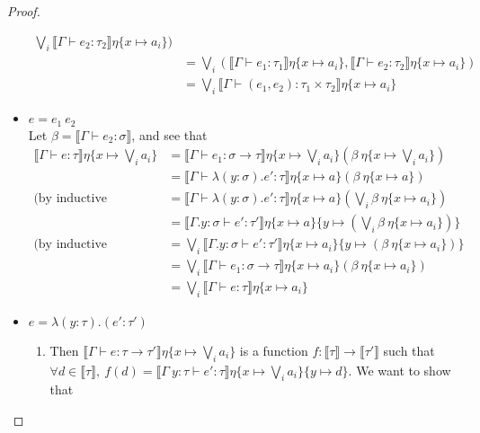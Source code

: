 \begin{proof}
\begin{itemize}
\begin{align*}
 \bigvee_i \llbracket \Gamma \vdash e_2 : \tau_2 \rrbracket\eta\{x \mapsto a_i\}) \\
 &= \bigvee_i ( \llbracket \Gamma \vdash e_1 : \tau_1 \rrbracket\eta\{x \mapsto a_i\},
  \llbracket \Gamma \vdash e_2 : \tau_2 \rrbracket\eta\{x \mapsto a_i\}) \\
  &= \bigvee_i \llbracket \Gamma \vdash (e_1, e_2): \tau_1 \times \tau_2 \rrbracket\eta\{x\mapsto a_i\}
  \end{align*}
 \item $ e = e_1 \ e_2$ \\ 
Let $\beta = \llbracket \Gamma \vdash e_2 : \sigma \rrbracket$, and see that
\begin{align*}
\llbracket \Gamma \vdash e : \tau \rrbracket\eta\{x \mapsto \bigvee_i a_i \} &=
\llbracket \Gamma \vdash e_1 : \sigma \rightarrow \tau \rrbracket\eta\{x \mapsto \bigvee_i a_i\}
(\beta \ \eta\{x \mapsto \bigvee_i a_i\}) \\
&= \llbracket \Gamma \vdash \lambda (y:\sigma).e' : \tau \rrbracket\eta\{x \mapsto a\}
(\beta \ \eta\{x \mapsto a\}) \\
\text{(by inductive hypothesis)} &= 
\llbracket \Gamma \vdash \lambda (y:\sigma).e' : \tau \rrbracket\eta\{x \mapsto a\}
(\bigvee_i\beta\ \eta\{x \mapsto a_i\}) \\
&= \llbracket \Gamma. y : \sigma \vdash e' : \tau' \rrbracket\eta\{x \mapsto a\}\{y \mapsto (\bigvee_i\beta\ \eta\{x \mapsto a_i\})\} \\
\text{(by inductive hypothesis)}&= \bigvee_i \llbracket \Gamma. y : \sigma \vdash e' : \tau' \rrbracket\eta\{x \mapsto 
a_i\}\{y \mapsto (\beta \ \eta\{x \mapsto a_i\})\} \\
&=\bigvee_i \llbracket \Gamma \vdash e_1: \sigma \rightarrow \tau\rrbracket\eta\{x\mapsto a_i\}
(\beta \ \eta\{x\mapsto a_i\}) \\
&= \bigvee_i \llbracket \Gamma \vdash e:\tau\rrbracket\eta\{ x \mapsto a_i\} 
\end{align*}
 \item $e = \lambda (y : \tau) . (e' : \tau')$
 \begin{enumerate}
 \item Then $\llbracket \Gamma \vdash e : \tau \rightarrow \tau' \rrbracket\eta\{x\mapsto  \bigvee_i a_i\}$ 
 is a function $f: \llbracket \tau \rrbracket \rightarrow \llbracket \tau'  \rrbracket$ such that 
 $\forall d \in \llbracket \tau \rrbracket, \ f(d) = \llbracket \Gamma \ y : \tau \vdash e' : \tau 
 \rrbracket\eta\{x\mapsto  \bigvee_i a_i\}\{y \mapsto d\}$. We want to show that
 

\end{enumerate}
\end{itemize}
\end{proof}
